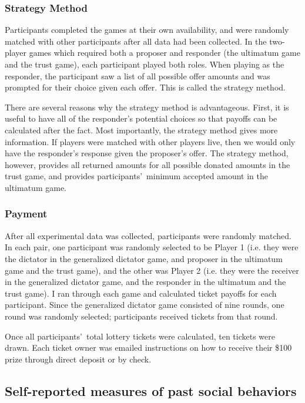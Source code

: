 \documentclass[12pt]{article}
\begin{document}
\subsubsection{Strategy Method}

Participants completed the games at their own availability, and were randomly matched with other participants after all data had been collected. In the two-player games which required both a proposer and responder (the ultimatum game and the trust game), each participant played both roles. When playing as the responder, the participant saw a list of all possible offer amounts and was prompted for their choice given each offer. This is called the strategy method.

There are several reasons why the strategy method is advantageous. First, it is useful to have all of the responder\rq s potential choices so that payoffs can be calculated after the fact. Most importantly, the strategy method gives more information. If players were matched with other players live, then we would only have the responder\rq s response given the proposer\rq s offer. The strategy method, however, provides all returned amounts for all possible donated amounts in the trust game, and provides participants\rq \ minimum accepted amount in the ultimatum game. 

\subsubsection{Payment}

After all experimental data was collected, participants were randomly matched. In each pair, one participant was randomly selected to be Player 1 (i.e. they were the dictator in the generalized dictator game, and proposer in the ultimatum game and the trust game), and the other was Player 2 (i.e. they were the receiver in the generalized dictator game, and the responder in the ultimatum and the trust game). I ran through each game and calculated ticket payoffs for each participant. Since the generalized dictator game consisted of nine rounds, one round was randomly selected; participants received tickets from that round. 

Once all participants\rq \ total lottery tickets were calculated, ten tickets were drawn. Each ticket owner was emailed instructions on how to receive their \$100 prize through direct deposit or by check. 

\subsection{Self-reported measures of past social behaviors}
\end{document}
